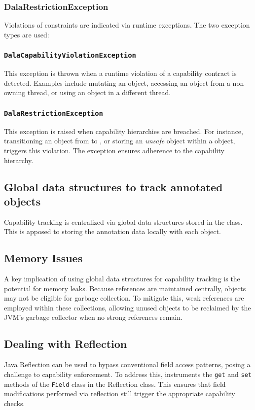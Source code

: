 \documentclass[JDala.tex]{subfiles}
\begin{document}
\subsubsection{DalaRestrictionException}

Violations of \dala constraints are indicated via runtime exceptions. The two exception types are used:

\subsubsection{\texttt{DalaCapabilityViolationException}}
This exception is thrown when a runtime violation of a capability contract is detected. Examples include mutating an \Immutable object, accessing an \Isolated object from a non-owning thread, or using an \Local object in a different thread.

\subsubsection{\texttt{DalaRestrictionException}}
This exception is raised when capability hierarchies are breached. For instance, transitioning an object from \Immutable to \Isolated, or storing an \textit{unsafe} object within a \Local object, triggers this violation. The exception ensures adherence to the \dala capability hierarchy.

\subsection{Global data structures to track annotated objects}
\label{subsection:globalDataStructures}
Capability tracking is centralized via global data structures stored in the \jdala class. This is apposed to storing the annotation data locally with each object. 

\subsection{Memory Issues}
A key implication of using global data structures for capability tracking is the potential for memory leaks. Because references are maintained centrally, objects may not be eligible for garbage collection. To mitigate this, weak references are employed within these collections, allowing unused objects to be reclaimed by the JVM's garbage collector when no strong references remain.


\subsection{Dealing with Reflection}
Java Reflection can be used to bypass conventional field access patterns, posing a challenge to capability enforcement. To address this, \jdala instruments the \texttt{get} and \texttt{set} methods of the \texttt{Field} class in the Reflection class. This ensures that field modifications performed via reflection still trigger the appropriate capability checks.
\end{document}
